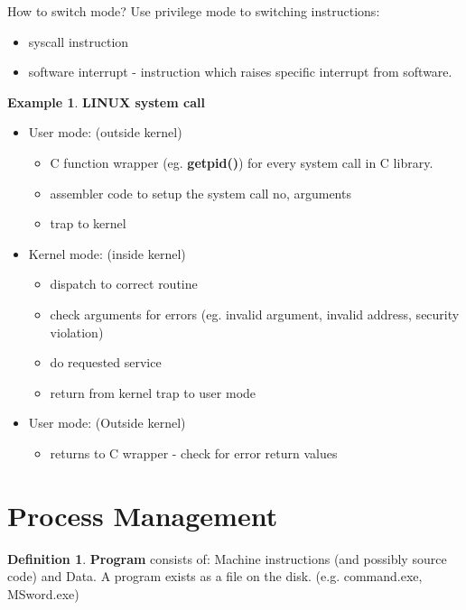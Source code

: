 \documentclass[12pt,a4paper]{article}
\theoremstyle{definition}
\newtheorem{definition}{Definition}[section]
\newtheorem{example}{Example}[section]
\newenvironment{myitemize}
{ \begin{itemize}
    \setlength{\itemsep}{5pt}
    \setlength{\parskip}{0pt}
    \setlength{\parsep}{0pt}     }
{ \end{itemize}                  }
\begin{document}
\begin{tcolorbox}
	\textsf{How to switch mode?} Use privilege mode to switching instructions:
	\begin{myitemize}
		\item syscall instruction
		\item software interrupt - instruction which raises specific interrupt from software.
	\end{myitemize}
\end{tcolorbox}

\begin{example}{\textbf{LINUX system call}}
	\begin{myitemize}
		\item User mode: (outside kernel)
		\begin{myitemize}
			\item C function wrapper (eg. \textbf{getpid()}) for every system call in C library.
			\item assembler code to setup the system call no, arguments
			\item trap to kernel	
		\end{myitemize}
		\item Kernel mode: (inside kernel)
		\begin{myitemize}
			\item dispatch to correct routine
			\item check arguments for errors (eg. invalid argument, invalid address, security violation)
			\item do requested service
			\item return from kernel trap to user mode
		\end{myitemize}
		\item User mode: (Outside kernel)
		\begin{myitemize}
			\item returns to C wrapper - check for error return values
		\end{myitemize}
	\end{myitemize}
\end{example}



\section{Process Management}
\begin{definition}{\textbf{Program}}
	consists of: Machine instructions (and possibly source code) and Data. A program exists as a file on the disk. (e.g. command.exe, MSword.exe)
\end{definition}
\end{document}
